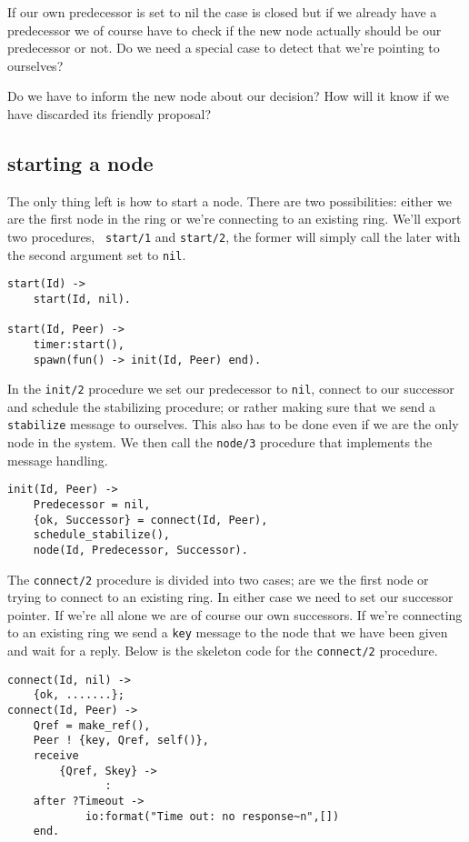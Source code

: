 \documentclass[a4paper,11pt]{article}
\begin{document}
If our own predecessor is set to nil the case is closed but if we
already have a predecessor we of course have to check if the new node
actually should be our predecessor or not. Do we need a special case
to detect that we're pointing to ourselves?

Do we have to inform the new node about our decision? How will
it know if we have discarded its friendly proposal?

\subsection{starting a node}

The only thing left is how to start a node. There are two
possibilities: either we are the first node in the ring or we're
connecting to an existing ring. We'll export two procedures, {\tt
  start/1} and {\tt start/2}, the former will simply call the later
with the second argument set to {\tt nil}.

\begin{verbatim}
start(Id) ->
    start(Id, nil).

start(Id, Peer) ->
    timer:start(),
    spawn(fun() -> init(Id, Peer) end).
\end{verbatim}

In the {\tt init/2} procedure we set our predecessor to {\tt nil},
connect to our successor and schedule the stabilizing procedure; or
rather making sure that we send a {\tt stabilize} message to
ourselves. This also has to be done even if we are the only node in the
system. We then call the {\tt node/3} procedure that implements the message
handling.

\begin{verbatim}
init(Id, Peer) ->
    Predecessor = nil,
    {ok, Successor} = connect(Id, Peer),
    schedule_stabilize(),    
    node(Id, Predecessor, Successor).
\end{verbatim}

The {\tt connect/2} procedure is divided into two cases; are we the
first node or trying to connect to an existing ring. In either case we
need to set our successor pointer. If we're all alone we are of course
our own successors. If we're connecting to an existing ring we send a
{\tt key} message to the node that we have been given and wait
for a reply. Below is the skeleton code for the {\tt connect/2} procedure.

\begin{verbatim}
connect(Id, nil) ->
    {ok, .......};    
connect(Id, Peer) ->
    Qref = make_ref(),
    Peer ! {key, Qref, self()},
    receive
        {Qref, Skey} ->
               :
    after ?Timeout ->
            io:format("Time out: no response~n",[])
    end.
\end{verbatim}
\end{document}
